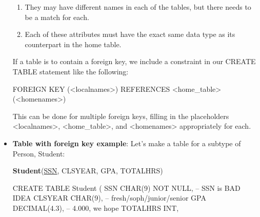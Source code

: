 \documentclass{report}
\begin{document}
\begin{itemize}
\begin{enumerate}
                \item They may have different names in each of the tables, but there needs to be a match for each.
                \item Each of these attributes must have the exact same data type as its counterpart in the home table.
            \end{enumerate}
            \bigbreak \noindent 
            If a table is to contain a foreign key, we include a constraint in our CREATE TABLE statement like the following:
            \begin{sqlcode}
                FOREIGN KEY (<localnames>) REFERENCES <home_table>(<homenames>)
            \end{sqlcode}
            This can be done for multiple foreign keys, filling in the placeholders <localnames>, <home\_table>, and <homenames> appropriately for each.
    \item \textbf{Table with foreign key example}: Let's make a table for a subtype of Person, Student:
        \begin{center}
            \textbf{Student}(\underline{SSN}\dag, CLSYEAR, GPA, TOTALHRS)
        \end{center}
        \bigbreak \noindent 
        \begin{sqlcode}
            CREATE TABLE Student (
                SSN CHAR(9) NOT NULL, -- SSN is BAD IDEA
                CLSYEAR CHAR(9), -- fresh/soph/junior/senior
                GPA DECIMAL(4.3), -- 4.000, we hope
                TOTALHRS INT,


\end{sqlcode}
\end{itemize}
\end{document}
